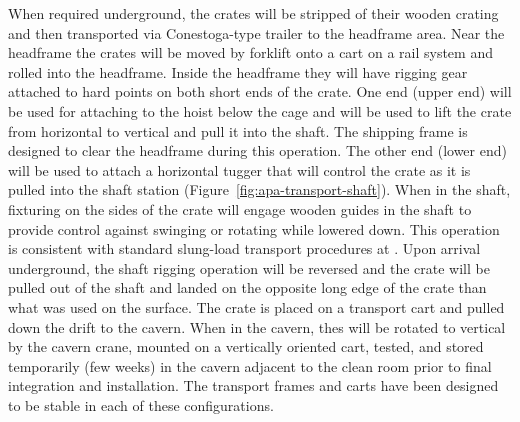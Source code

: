 When required underground, the crates will be stripped of their wooden crating and then transported via Conestoga-type trailer to the headframe area. Near the headframe the crates will be moved by forklift onto a cart on a rail system and rolled into the headframe. Inside the headframe they will have rigging gear attached to hard points on both short ends of the crate. One end (upper end) will be used for attaching to the hoist below the cage and will be used to lift the crate from horizontal to vertical and pull it into the shaft. The shipping frame is designed to clear the headframe during this operation. The other end (lower end) will be used to attach a horizontal tugger that will control the crate as it is pulled into the shaft station (Figure~\ref{fig:apa-transport-shaft}). When in the shaft, fixturing on the sides of the crate will engage wooden guides in the shaft to provide control against swinging or rotating while lowered down. This operation is consistent with standard slung-load transport procedures at . Upon arrival underground, the shaft rigging operation will be reversed and the crate will be pulled out of the shaft and landed on the opposite long edge of the crate than what was used on the surface. The crate is placed on a transport cart and pulled down the drift to the cavern. When in the cavern, thes will be rotated to vertical by the cavern crane, mounted on a vertically oriented cart, tested, and stored temporarily (few weeks) in the cavern adjacent to the clean room prior to final integration and installation. The transport frames and carts have been designed to be stable in each of these configurations. 

